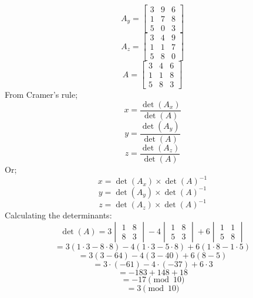 \documentclass[a4paper]{exam}
\begin{document}
\begin{questions}
\begin{solution}
\begin{parts}
\[                \]
                \[
                    A_y = \begin{bmatrix}
                        3 & 9 & 6\\
                        1 & 7 & 8\\
                        5 & 0 & 3
                    \end{bmatrix}
                \]
                \[
                    A_z = \begin{bmatrix}
                        3 & 4 & 9\\
                        1 & 1 & 7\\
                        5 & 8 & 0
                    \end{bmatrix}
                \]
                \[
                    A = \begin{bmatrix}
                        3 & 4 & 6\\
                        1 & 1 & 8\\
                        5 & 8 & 3
                    \end{bmatrix}
                \]
                From Cramer's rule;
                \[
                    x = \frac{\det(A_x)}{\det(A)}
                \]
                \[
                    y = \frac{\det(A_y)}{\det(A)}
                \]
                \[
                    z = \frac{\det(A_z)}{\det(A)}
                \]
                Or;
                \[
                    x = \det(A_x) \times \det(A)^{-1}
                \]
                \[
                    y = \det(A_y) \times \det(A)^{-1}
                \]
                \[
                    z = \det(A_z) \times \det(A)^{-1}
                \]
                Calculating the determinants:
                \[
                    \det(A) = 3 \begin{vmatrix} 1 & 8 \\ 8 & 3 \end{vmatrix} - 4 \begin{vmatrix} 1 & 8 \\ 5 & 3 \end{vmatrix} + 6 \begin{vmatrix} 1 & 1 \\ 5 & 8 \end{vmatrix}
                \]
                \[    = 3 (1 \cdot 3 - 8 \cdot 8) - 4 (1 \cdot 3 - 5 \cdot 8) + 6 (1 \cdot 8 - 1 \cdot 5)\]
                \[    = 3 (3 - 64) - 4 (3 - 40) + 6 (8 - 5)\]
                \[    = 3 \cdot (-61) - 4 \cdot (-37) + 6 \cdot 3\]
                \[    = -183 + 148 + 18\]
                \[    = -17 \pmod{10}\]
                \[    = 3 \pmod{10}\]


\end{parts}
\end{solution}
\end{questions}
\end{document}
